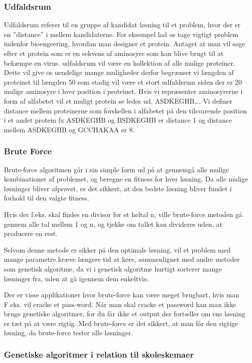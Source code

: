 \subsubsection{Udfaldsrum}
Udfaldsrum referer til en gruppe af kandidat løsning til et problem, hvor der er en ”distance” i mellem kandidaterne. For eksempel lad os tage vigtigt problem indenfor bioengeering, hvordan man designer et protein. Antaget at man vil søge efter et protein som er en sekvens af aminosyre som kan blive brugt til at bekæmpe en virus. udfaldsrum vil være en kollektion af alle mulige proteiner. Dette vil give os uendelige mange muligheder derfor begrænser vi længden af proteinet til længden 50 som stadig vil være et stort udfaldsrum siden der er 20 mulige aminosyre i hver position i proteinet. Hvis vi repræsenter aminosyrerne i form af alfabetet vil et muligt protein se ledes ud. 
ASDKEGHB…. Vi definer distance mellem proteinerne som forskellen i alfabetet på den tilsvarende position i et andet protein fx ASDKEGHB og BSDKEGHB er distance 1 og distance mellem ASDKEGHB og GCCHAKAA er 8.


\subsubsection{Brute Force}

Brute-force algoritmen går i sin simple form ud på at gennemgå alle mulige kombinationer af problemet, og beregne en fitness for hver løsning. Da alle mulige løsninger bliver afprøvet, er det sikkert, at den bedste løsning bliver fundet i forhold til den valgte fitness. 

Hvis der f.eks. skal findes en divisor for et heltal n, ville brute-force metoden gå gennem alle tal mellem 1 og n, og tjekke om tallet kan divideres uden, at producere en rest.

Selvom denne metode er sikker på den optimale løsning, vil et problem med mange parametre kræve længere tid at køre, sammenlignet med andre metoder som genetisk algoritme, da vi i genetisk algoritme hurtigt sorterer mange løsninger fra, uden at gå igennem dem enkeltvis.

Der er visse applikationer hvor brute-force kan være meget brugbart, hvis man F.eks. vil cracke et pass-word. Når man skal cracke et password kan man ikke bruge genetiske algoritmer, for du får ikke et output der fortæller om ens løsning er tæt på at være rigtig. Med brute-force er det sikkert, at man får den rigtige løsning, da brute-force tester alle løsninger.


\subsubsection{Genetiske algoritmer i relation til skoleskemaer}
  